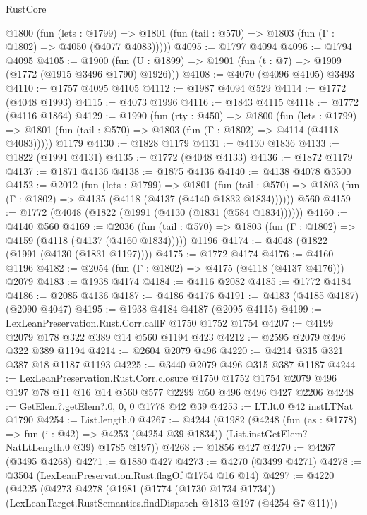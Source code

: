 \begin{lexlean}{RustCore}
\begin{coremodule}
    @1800
      (fun (lets : @1799) =>
      @1801 (fun (tail : @570) => @1803 (fun (Γ : @1802) => @4050 (@4077 @4083)))))
@4095 := @1797 @4094
@4096 := @1794 @4095
@4105 := @1900 (fun (U : @1899) => @1901 (fun (t : @7) => @1909 (@1772 (@1915 @3496 @1790) @1926)))
@4108 := @4070 (@4096 @4105) @3493
@4110 := @1757 @4095 @4105
@4112 := @1987 @4094 @529
@4114 := @1772 (@4048 @1993)
@4115 := @4073 @1996
@4116 := @1843 @4115
@4118 := @1772 (@4116 @1864)
@4129 := @1990
    (fun (rty : @450) =>
    @1800
      (fun (lets : @1799) =>
      @1801 (fun (tail : @570) => @1803 (fun (Γ : @1802) => @4114 (@4118 @4083)))))
    @1179
@4130 := @1828 @1179
@4131 := @4130 @1836
@4133 := @1822 (@1991 @4131)
@4135 := @1772 (@4048 @4133)
@4136 := @1872 @1179
@4137 := @1871 @4136
@4138 := @1875 @4136
@4140 := @4138 @4078 @3500
@4152 := @2012
    (fun (lets : @1799) =>
    @1801
      (fun (tail : @570) => @1803 (fun (Γ : @1802) => @4135 (@4118 (@4137 (@4140 @1832 @1834))))))
    @560
@4159 := @1772 (@4048 (@1822 (@1991 (@4130 (@1831 (@584 @1834))))))
@4160 := @4140 @560
@4169 := @2036
    (fun (tail : @570) => @1803 (fun (Γ : @1802) => @4159 (@4118 (@4137 (@4160 @1834)))))
    @1196
@4174 := @4048 (@1822 (@1991 (@4130 (@1831 @1197))))
@4175 := @1772 @4174
@4176 := @4160 @1196
@4182 := @2054 (fun (Γ : @1802) => @4175 (@4118 (@4137 @4176))) @2079
@4183 := @1938 @4174
@4184 := @4116 @2082
@4185 := @1772 @4184
@4186 := @2085 @4136
@4187 := @4186 @4176
@4191 := @4183 (@4185 @4187) (@2090 @4047)
@4195 := @1938 @4184 @4187 (@2095 @4115)
@4199 := LexLeanPreservation.Rust.Corr.callF @1750 @1752 @1754
@4207 := @4199 @2079 @178 @322 @389 @14 @560 @1194 @423
@4212 := @2595 @2079 @496 @322 @389 @1194
@4214 := @2604 @2079 @496
@4220 := @4214 @315 @321 @387 @18 @1187 @1193
@4225 := @3440 @2079 @496 @315 @387 @1187
@4244 := LexLeanPreservation.Rust.Corr.closure
    @1750
    @1752
    @1754
    @2079
    @496
    @197
    @78
    @11
    @16
    @14
    @560
    @577
    @2299
    @50
    @496
    @496
    @427
    @2206
@4248 := GetElem?.getElem?.{0, 0, 0} @1778 @42 @39
@4253 := LT.lt.{0} @42 instLTNat @1790
@4254 := List.length.{0}
@4267 := @4244
    (@1982
      (@4248
        (fun (as : @1778) => fun (i : @42) => @4253 (@4254 @39 @1834))
        (List.instGetElem?NatLtLength.{0} @39)
        @1785
        @197))
@4268 := @1856 @427
@4270 := @4267 (@3495 @4268)
@4271 := @1880 @427
@4273 := @4270 (@3499 @4271)
@4278 := @3504 (LexLeanPreservation.Rust.flagOf @1754 @16 @14)
@4297 := @4220
    (@4225
      (@4273
        @4278
        (@1981
          (@1774 (@1730 @1734 @1734))
          (LexLeanTarget.RustSemantics.findDispatch @1813 @197 (@4254 @7 @11)))

\end{coremodule}
\end{lexlean}
